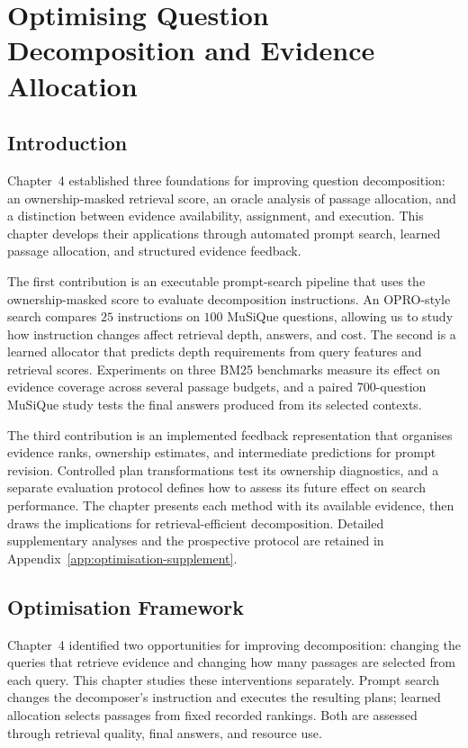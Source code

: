 \chapter{Optimising Question Decomposition and Evidence Allocation}
\label{chap:optimisation}
\label{chap:guarantees}

\section*{Introduction}

Chapter~4 established three foundations for improving question decomposition:
an ownership-masked retrieval score, an oracle analysis of passage allocation,
and a distinction between evidence availability, assignment, and execution.
This chapter develops their applications through automated prompt search,
learned passage allocation, and structured evidence feedback.

The first contribution is an executable prompt-search pipeline that uses the
ownership-masked score to evaluate decomposition instructions. An OPRO-style
search compares $25$ instructions on $100$ MuSiQue questions, allowing us to
study how instruction changes affect retrieval depth, answers, and cost.
The second is a learned allocator that predicts depth requirements from query
features and retrieval scores. Experiments on three BM25 benchmarks measure its 
effect on evidence coverage across several passage budgets, and a paired 700-question 
MuSiQue study tests the final answers produced from its selected contexts.

The third contribution is an implemented feedback representation that
organises evidence ranks, ownership estimates, and intermediate predictions
for prompt revision. Controlled plan transformations test its ownership
diagnostics, and a separate evaluation protocol defines how to assess its
future effect on search performance. The chapter presents each method with
its available evidence, then draws the implications for retrieval-efficient
decomposition. Detailed supplementary analyses and the prospective protocol
are retained in Appendix~\ref{app:optimisation-supplement}.

\section{Optimisation Framework}

Chapter~4 identified two opportunities for improving decomposition: changing
the queries that retrieve evidence and changing how many passages are selected
from each query. This chapter studies these interventions separately.
Prompt search changes the decomposer's instruction and executes the resulting
plans; learned allocation selects passages from fixed recorded rankings.
Both are assessed through retrieval quality, final answers, and resource use.

